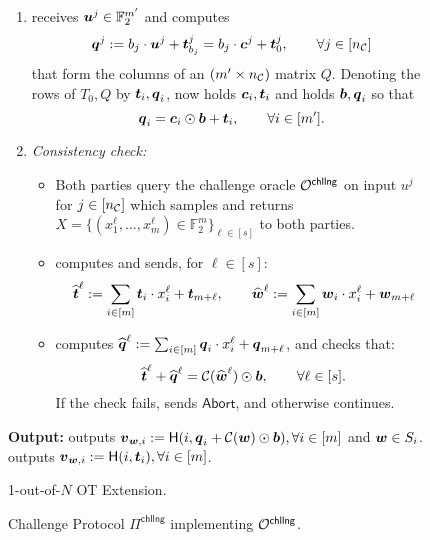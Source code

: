 \begin{figure}[t]
{\begin{minipage}{0.95\linewidth}
\begin{enumerate}
				\item \send receives $\boldsymbol{u}^j\in\mathbb{F}^{m'}_2$ and computes
				$$
					\boldsymbol{q}^j := b_j \cdot \boldsymbol{u}^j +\boldsymbol{t}^j_{b_j} = b_j\cdot \boldsymbol{c}^j+\boldsymbol{t}^j_0,\qquad \forall j\in[{n_\mathcal{C}}]
				$$
				that form the columns of an $(m'\times {n_\mathcal{C}})$ matrix $Q$. Denoting the rows of $T_0, Q$ by $\boldsymbol{t}_i,\boldsymbol{q}_i$, \rec now holds $\boldsymbol{c}_i,\boldsymbol{t}_i$ and \send holds $\boldsymbol{b}, \boldsymbol{q}_i$ so that 
				$$
					\boldsymbol{q}_i = \boldsymbol{c}_i\odot \boldsymbol{b}+\boldsymbol{t}_i,\qquad \forall i\in[m'].
				$$
				
				\item \emph{Consistency check:}
				\begin{itemize}
					\item Both parties query the challenge oracle $\mathcal{O}^{\textsf{chllng}}$ on input $u^j$ for $j\in[{n_\mathcal{C}}]$  which samples and returns $X=\{(x_1^{\ell}, ...,x_m^{\ell} )\in \mathbb{F}^m_2\}_{\ell\in[s]}$ %
					to both parties.
					
					\item \rec computes and sends, for $\ell \in[s]$:
					$$
						\widehat {\boldsymbol{t}}^{\ell} := \sum_{i\in[m]} \boldsymbol{t}_i \cdot x_i^\ell + \boldsymbol{t}_{m+\ell}, \qquad \widehat {\boldsymbol{w}}^\ell := \sum_{i\in[m]} \boldsymbol{w}_i \cdot x_i^\ell + \boldsymbol{w}_{m+\ell}
					$$
					
					\item \send computes $\widehat {\boldsymbol{q}}^\ell := \sum_{i\in[m]} \boldsymbol{q}_i \cdot x^\ell_i + \boldsymbol{q}_{m+\ell}$, and checks that:
					$$
						\widehat{\boldsymbol{t}}^\ell + \widehat{\boldsymbol{q}}^\ell = \mathcal{C}(\widehat{\boldsymbol{w}}^\ell) \odot \boldsymbol{b}, \qquad \forall\ell\in[s].
					$$
					If the check fails, \send sends $\textsf{Abort}$, and otherwise continues.
				\end{itemize}
			\end{enumerate}
		
		\textbf{Output:} \send outputs $\boldsymbol{v}_{\boldsymbol{w},i}:=\mathsf{H}(i,\boldsymbol{q}_i+\mathcal{C}(\boldsymbol{w})\odot \boldsymbol{b}), \forall i\in[m]$ and $\boldsymbol{w}\in S_i$. \rec outputs $\boldsymbol{v}_{\boldsymbol{w},i}:= \mathsf{H}(i,\boldsymbol{t}_i), \forall i\in[m]$.
	\end{minipage}}
	\caption{ 1-out-of-$N$ OT Extension.}
	\label{fig:otExt}
\end{figure}


\begin{figure}[t]
	\caption{ Challenge Protocol $\Pi^\textsf{chllng}$ implementing $\mathcal{O}^\textsf{chllng}$.}
	\label{fig:OChallenge}
\end{figure}


